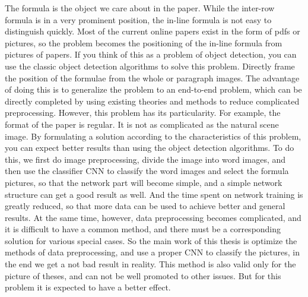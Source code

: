 \begin{eabstract}
	The formula is the object we care about in the paper. While the inter-row formula is in a very prominent position, the in-line formula is not easy to distinguish quickly. Most of the current online papers exist in the form of pdfs or pictures, so the problem becomes the positioning of the in-line formula from pictures of papers. If you think of this as a problem of object detection, you can use the classic object detection algorithms to solve this problem. Directly frame the position of the formulae from the whole or paragraph images. The advantage of doing this is to generalize the problem to an end-to-end problem, which can be directly completed by using existing theories and methods to reduce complicated preprocessing. However, this problem has its particularity. For example, the format of the paper is regular. It is not as complicated as the natural scene image. By formulating a solution according to the characteristics of this problem, you can expect better results than using the object detection algorithms. To do this, we first do image preprocessing, divide the image into word images, and then use the classifier CNN to classify the word images and select the formula pictures, so that the network part will become simple, and a simple network structure can get a good result as well. And the time spent on network training is greatly reduced, so that more data can be used to achieve better and general results. At the same time, however, data preprocessing becomes complicated, and it is difficult to have a common method, and there must be a corresponding solution for various special cases. So the main work of this thesis is optimize the methods of data preprocessing, and use a proper CNN to classify the pictures, in the end we get a not bad result in reality. This method is also valid only for the picture of theses, and can not be well promoted to other issues. But for this problem it is expected to have a better effect.
\end{eabstract}
